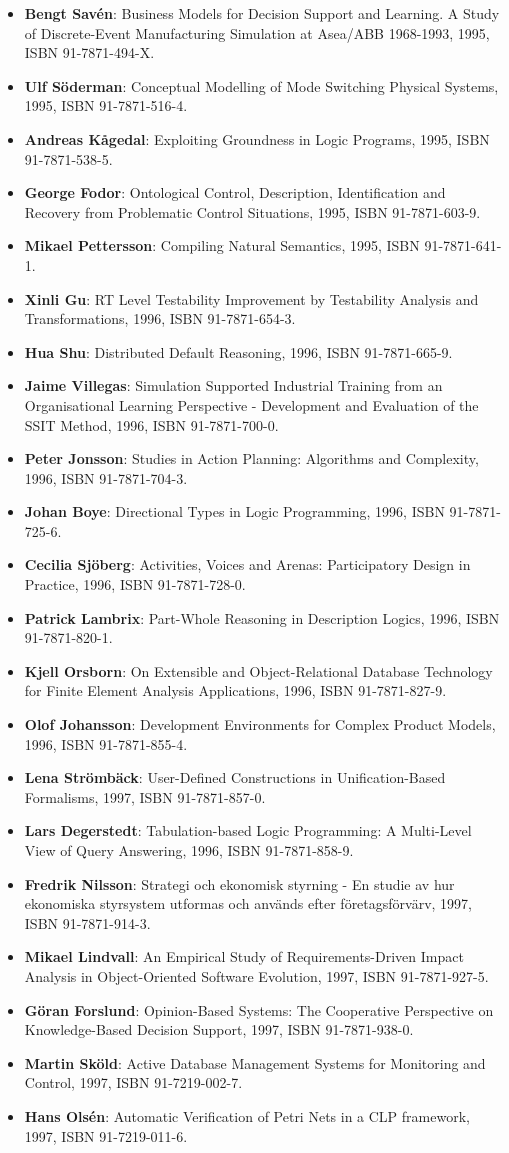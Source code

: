 \documentclass[a4paper,showtrims,twocolumn]{memoir}
\newenvironment{theses}
  {
    \begin{itemize}
      \setlength{\itemsep}{0.2em}
      \setlength{\parskip}{0em}
      \setlength{\parsep}{0em}
  }
  {
    \end{itemize}
  }
\newcommand{\thesis}[5]{\item[No. #1] \textbf{#2}: #3, #4, ISBN #5.}
\begin{document}
\begin{theses}
    \thesis{371}{Bengt Savén}{Business Models for Decision Support and Learning. A Study of Discrete-Event Manufacturing Simulation at Asea/ABB 1968-1993}{1995}{91-7871-494-X}
    \thesis{375}{Ulf Söderman}{Conceptual Modelling of Mode Switching Physical Systems}{1995}{91-7871-516-4}
    \thesis{383}{Andreas Kågedal}{Exploiting Groundness in Logic Programs}{1995}{91-7871-538-5}
    \thesis{396}{George Fodor}{Ontological Control, Description, Identification and Recovery from Problematic Control Situations}{1995}{91-7871-603-9}
    \thesis{413}{Mikael Pettersson}{Compiling Natural Semantics}{1995}{91-7871-641-1}
    \thesis{414}{Xinli Gu}{RT Level Testability Improvement by Testability Analysis and Transformations}{1996}{91-7871-654-3}
    \thesis{416}{Hua Shu}{Distributed Default Reasoning}{1996}{91-7871-665-9}
    \thesis{429}{Jaime Villegas}{Simulation Supported Industrial Training from an Organisational Learning Perspective - Development and Evaluation of the SSIT Method}{1996}{91-7871-700-0}
    \thesis{431}{Peter Jonsson}{Studies in Action Planning: Algorithms and Complexity}{1996}{91-7871-704-3}
    \thesis{437}{Johan Boye}{Directional Types in Logic Programming}{1996}{91-7871-725-6}
    \thesis{439}{Cecilia Sjöberg}{Activities, Voices and Arenas: Participatory Design in Practice}{1996}{91-7871-728-0}
    \thesis{448}{Patrick Lambrix}{Part-Whole Reasoning in Description Logics}{1996}{91-7871-820-1}
    \thesis{452}{Kjell Orsborn}{On Extensible and Object-Relational Database Technology for Finite Element Analysis Applications}{1996}{91-7871-827-9}
    \thesis{459}{Olof Johansson}{Development Environments for Complex Product Models}{1996}{91-7871-855-4}
    \thesis{461}{Lena Strömbäck}{User-Defined Constructions in Unification-Based Formalisms}{1997}{91-7871-857-0}
    \thesis{462}{Lars Degerstedt}{Tabulation-based Logic Programming: A Multi-Level View of Query Answering}{1996}{91-7871-858-9}
    \thesis{475}{Fredrik Nilsson}{Strategi och ekonomisk styrning - En studie av hur ekonomiska styrsystem utformas och används efter företagsförvärv}{1997}{91-7871-914-3}
    \thesis{480}{Mikael Lindvall}{An Empirical Study of Requirements-Driven Impact Analysis in Object-Oriented Software Evolution}{1997}{91-7871-927-5}
    \thesis{485}{Göran Forslund}{Opinion-Based Systems: The Cooperative Perspective on Knowledge-Based Decision Support}{1997}{91-7871-938-0}
    \thesis{494}{Martin Sköld}{Active Database Management Systems for Monitoring and Control}{1997}{91-7219-002-7}
    \thesis{495}{Hans Olsén}{Automatic Verification of Petri Nets in a CLP framework}{1997}{91-7219-011-6}

\end{theses}
\end{document}
